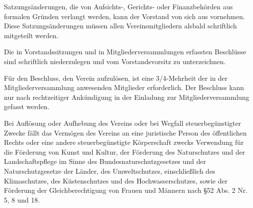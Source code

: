 \begin{contract}
    Satzungsänderungen, die von Aufsichts-, Gerichts- oder Finanzbehörden aus formalen Gründen verlangt werden, kann der Vorstand von sich aus vornehmen. Diese Satzungsänderungen müssen allen Vereinsmitgliedern alsbald schriftlich mitgeteilt werden.

    Die in Vorstandssitzungen und in Mitgliederversammlungen erfassten Beschlüsse sind schriftlich niederzulegen und vom Vorstandsvorsitz zu unterzeichnen.

    Für den Beschluss, den Verein aufzulösen, ist eine 3/4-Mehrheit der in der Mitgliederversammlung anwesenden Mitglieder erforderlich. Der Beschluss kann nur nach rechtzeitiger Ankündigung in der Einladung zur Mitgliederversammlung gefasst werden.

    Bei Auflösung oder Aufhebung des Vereins oder bei Wegfall steuerbegünstigter Zwecke fällt das Vermögen des Vereins an eine juristische Person des öffentlichen Rechts oder eine andere steuerbegünstigte Körperschaft zwecks Verwendung für die Förderung von Kunst und Kultur, der Förderung des Naturschutzes und der Landschaftspflege im Sinne des Bundesnaturschutzgesetzes und der Naturschutzgesetze der Länder, des Umweltschutzes, einschließlich des Klimaschutzes, des Küstenschutzes und des Hochwasserschutzes, sowie der Förderung der Gleichberechtigung von Frauen und Männern nach \S 52 Abs. 2 Nr. 5, 8 und 18.

\end{contract}


